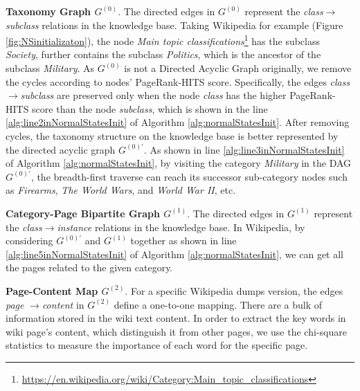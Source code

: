 \documentclass[runningheads,a4paper]{llncs}
\theoremstyle{exampstyle}
\begin{document}
\textbf{Taxonomy Graph \(G^{(0)}\)}. The directed edges in \(G^{(0)}\) represent the \textit{class}\(\rightarrow\)\textit{subclass} relations in the knowledge base. 
Taking Wikipedia for example (Figure \ref{fig:NSinitializaton}), the node \textit{Main topic classifications}\footnote{\url{https://en.wikipedia.org/wiki/Category:Main_topic_classifications}} has the subclass \textit{Society}, further contains the subclass \textit{Politics}, which is the ancestor of the subclass \textit{Military}.
As \(G^{(0)}\) is not a Directed Acyclic Graph originally\cite{faralli2015large}, we remove the cycles according to nodes' PageRank-HITS\cite{Yan:2015wq} score.
Specifically, the edges \textit{class}\(\rightarrow\)\textit{subclass} are preserved only when the node \textit{class} has the higher PageRank-HITS score than the node \textit{subclass}, which is shown in the line \ref{alg:line2inNormalStatesInit} of Algorithm \ref{alg:normalStatesInit}.
After removing cycles, the taxonomy structure on the knowledge base is better represented by the directed acyclic graph \(G^{(0)'}\).
As shown in line \ref{alg:line3inNormalStatesInit} of Algorithm \ref{alg:normalStatesInit}, by visiting the category \textit{Military} in the DAG \(G^{(0)'}\), the breadth-first traverse can reach its successor sub-category nodes such as \textit{Firearms}, \textit{The World Wars}, and \textit{World War II}, etc. 

\textbf{Category-Page Bipartite Graph \(G^{(1)}\)}. 
The directed edges in \(G^{(1)}\) represent the \textit{class}\(\rightarrow\)\textit{instance} relations in the knowledge base.
In Wikipedia, by considering \(G^{(0)'}\) and \(G^{(1)}\) together as shown in line \ref{alg:line5inNormalStatesInit} of Algorithm \ref{alg:normalStatesInit}, we can get all the pages related to the given category. 

\textbf{Page-Content Map \(G^{(2)}\)}. 
For a specific Wikipedia dumps version, the edges  \textit{page} \(\rightarrow\)\textit{content} in \(G^{(2)}\) define a one-to-one mapping.
There are a bulk of information stored in the wiki text content.
In order to extract the key words in wiki page's content, which distinguish it from other pages, we use the chi-square statistics\cite{yang1997comparative}\cite{liu2009imbalanced} to measure the importance of each word for the specific page.
\end{document}
